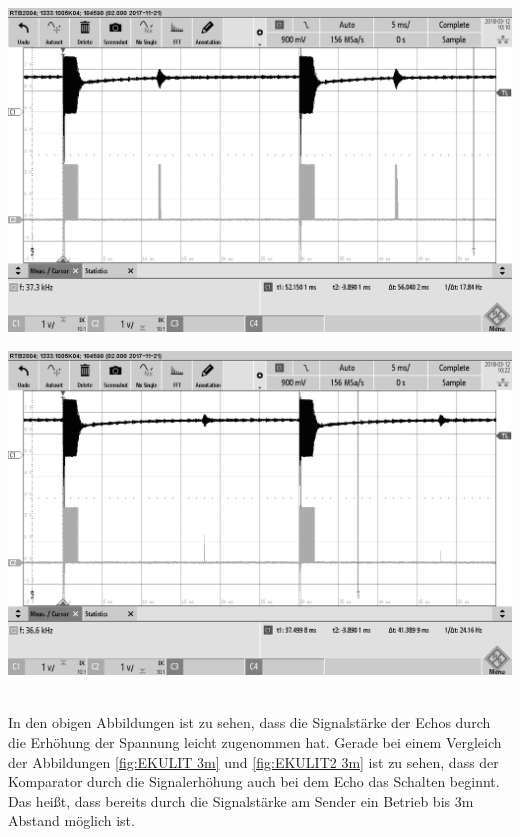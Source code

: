 \begin{minipage}{0.5\textwidth}
\includegraphics[width=1\textwidth%
]{Abbildungen/MessungenP2/15,75V/EKULIT2m.png}
\label{fig:EKULIT2 2m}
\end{minipage}
\begin{minipage}{0.5\textwidth}
\includegraphics[width=1\textwidth%
]{Abbildungen/MessungenP2/15,75V/EKULIT3m.png}
\label{fig:EKULIT2 3m}
\end{minipage}\\
In den obigen Abbildungen ist zu sehen, dass die Signalstärke der Echos durch die Erhöhung der Spannung leicht zugenommen hat. Gerade bei einem Vergleich der Abbildungen \ref{fig:EKULIT 3m} und \ref{fig:EKULIT2 3m} ist zu sehen, dass der Komparator durch die Signalerhöhung auch bei dem Echo das Schalten beginnt. Das heißt, dass bereits durch die Signalstärke am Sender ein Betrieb bis 3m Abstand möglich ist.

